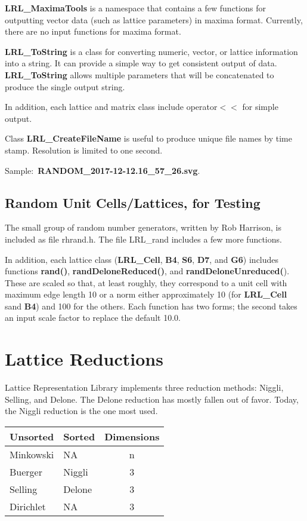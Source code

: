 \documentclass[11pt]{article} %
\begin{document}
\textbf{LRL\_MaximaTools} is a namespace that contains a few functions for outputting vector data (such as lattice parameters) in maxima format. Currently, there are no input functions for maxima format.

\textbf{LRL\_ToString} is a class for converting numeric, vector, or lattice information into a string. It can provide a simple way to get consistent output of data. \textbf{LRL\_ToString}  allows multiple parameters that will be concatenated to produce the single output string.

In addition, each lattice and matrix class include operator$<<$ for simple output.

Class \textbf{LRL\_CreateFileName} is useful to produce unique file names by time stamp. Resolution is limited to one second.

Sample$\colon$ \mbox{\textbf{RANDOM\_2017-12-12.16\_57\_26.svg}}.

\subsection{Random Unit Cells/Lattices, for Testing}


The small group of random number generators, written by Rob Harrison, is included as file rhrand.h. The file LRL\_rand includes a few more functions.

In addition, each lattice class (\textbf{LRL\_Cell}, \textbf{B4}, \textbf{S6}, \textbf{D7}, and \textbf{G6}) includes functions \textbf{rand()}, \textbf{randDeloneReduced()}, and \textbf{randDeloneUnreduced(}). These are scaled so that, at least roughly, they correspond to a unit cell with maximum edge length 10 or a norm either approximately 10 (for \textbf{LRL\_Cell} sand \textbf{B4}) and 100 for the others. Each function has two forms; the second takes an input scale factor to replace the default 10.0.

\section{Lattice Reductions}

Lattice Representation Library implements three reduction methods: Niggli, Selling, and Delone. The Delone reduction has mostly fallen out of favor. Today, the Niggli reduction is the one most used. 

\begin{center}
\begin{tabular}{|l|l|c|} %
\hline %
Unsorted & Sorted & Dimensions \\
\hline
Minkowski & NA & n \\
Buerger & Niggli & 3 \\
Selling & Delone & 3 \\
Dirichlet & NA & 3 \\
\hline
\end{tabular}
\end{center}
\end{document}
